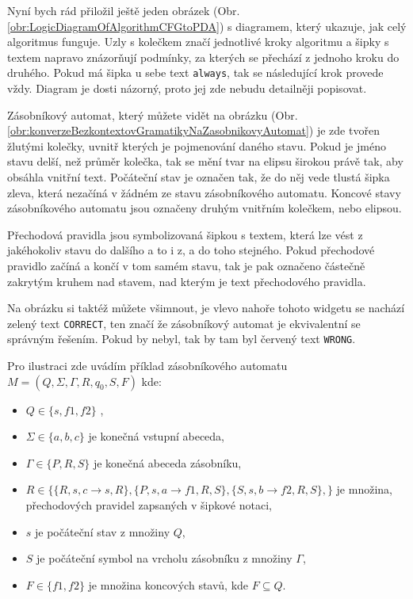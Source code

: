 Nyní bych rád přiložil ještě jeden obrázek (Obr. \ref{obr:LogicDiagramOfAlgorithmCFGtoPDA}) s diagramem, který ukazuje, jak celý algoritmus funguje. Uzly s kolečkem značí jednotlivé kroky algoritmu a šipky s textem napravo znázorňují podmínky, za kterých se přechází z jednoho kroku do druhého. Pokud má šipka u sebe text \texttt{always}, tak se následující krok provede vždy. Diagram je dosti názorný, proto jej zde nebudu detailněji popisovat.



Zásobníkový automat, který můžete vidět na obrázku (Obr. \ref{obr:konverzeBezkontextovGramatikyNaZasobnikovyAutomat}) je zde tvořen žlutými kolečky, uvnitř kterých je pojmenování daného stavu. Pokud je jméno stavu delší, než průměr kolečka, tak se mění tvar na elipsu širokou právě tak, aby obsáhla vnitřní text. Počáteční stav je označen tak, že do něj vede tlustá šipka zleva, která nezačíná v žádném ze stavu zásobníkového automatu. Koncové stavy zásobníkového automatu jsou označeny druhým vnitřním kolečkem, nebo elipsou.

Přechodová pravidla jsou symbolizovaná šipkou s textem, která lze vést z jakéhokoliv stavu do dalšího a to i z, a do toho stejného. Pokud přechodové pravidlo začíná a končí v tom samém stavu, tak je pak označeno částečně zakrytým kruhem nad stavem, nad kterým je text přechodového pravidla. 

Na obrázku si taktéž můžete všimnout, je vlevo nahoře tohoto widgetu se nachází zelený text \texttt{CORRECT}, ten značí že zásobníkový automat je ekvivalentní se správným řešením. Pokud by nebyl, tak by tam byl červený text \texttt{WRONG}. 

Pro ilustraci zde uvádím příklad zásobníkového automatu \( M = (Q, \Sigma, \Gamma, R, q_0, S, F) \) kde:
\begin{itemize}
\item \( Q \in \{ s, f1, f2 \} \) ,
\item \( \Sigma \in \{ a, b, c \} \) je konečná vstupní abeceda,
\item \( \Gamma \in \{ P, R, S \} \) je konečná abeceda zásobníku,
\item \( R \in \{ \{ R, s, c \rightarrow s, R \}, \{ P,s,a \rightarrow f1, R, S \}, \{ S, s, b \rightarrow f2, R, S\}, \} \) je množina, přechodových pravidel zapsaných v šipkové notaci,
\item \( s \) je počáteční stav z množiny \( Q \),
\item \( S \) je počáteční symbol na vrcholu zásobníku z množiny \( \Gamma \),
\item \( F \in \{ f1, f2\} \) je množina koncových stavů, kde \( F \subseteq Q \).
\end{itemize}


